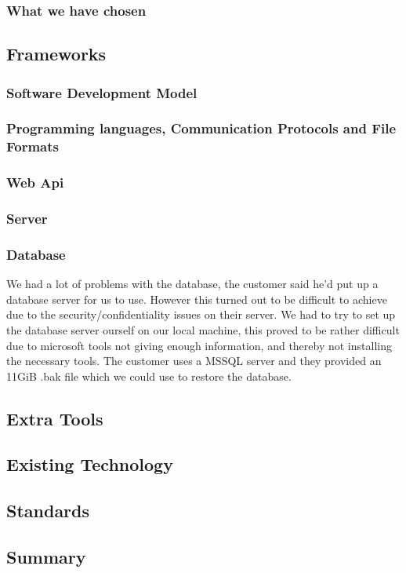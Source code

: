 \subsubsection{What we have chosen}
\subsection{Frameworks}
\subsubsection{Software Development Model}
\subsubsection{Programming languages, Communication Protocols and File Formats}
\subsubsection{Web Api}
\subsubsection{Server}
\subsubsection{Database}
We had a lot of problems with the database, the customer said he'd put up a database server for us to use. However this turned out to be difficult to achieve due to the security/confidentiality issues on their server. We had to try to set up the database server ourself on our local machine, this proved to be rather difficult due to microsoft tools not giving enough information, and thereby not installing the necessary tools.     
The customer uses a MSSQL server and they provided an 11GiB .bak file which we could use to restore the database.
\subsection{Extra Tools}
\subsection{Existing Technology}

\subsection{Standards}

\subsection{Summary}